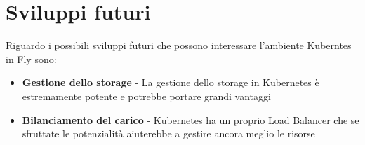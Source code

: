 \section{Sviluppi futuri}
Riguardo i possibili sviluppi futuri che possono interessare l'ambiente Kuberntes in Fly sono:

\begin{itemize}
    \item \textbf{Gestione dello storage} - La gestione dello storage in Kubernetes è estremamente potente e potrebbe portare grandi vantaggi
    \item \textbf{Bilanciamento del carico} - Kubernetes ha un proprio Load Balancer che se sfruttate le potenzialità aiuterebbe a gestire ancora meglio le risorse
\end{itemize}